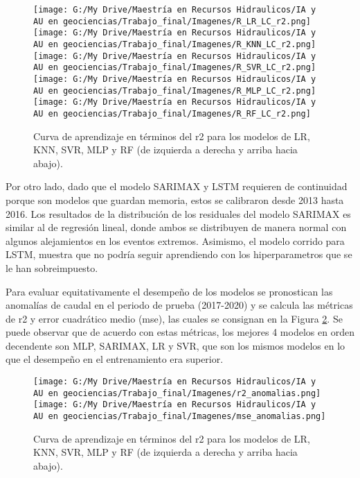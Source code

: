 \documentclass[draft]{agujournal2019}
\begin{document}
\begin{figure}[!]
	\centering%
	\texttt{[image: G:/My Drive/Maestría en Recursos Hidraulicos/IA y AU en geociencias/Trabajo\_final/Imagenes/R\_LR\_LC\_r2.png]}
	\texttt{[image: G:/My Drive/Maestría en Recursos Hidraulicos/IA y AU en geociencias/Trabajo\_final/Imagenes/R\_KNN\_LC\_r2.png]}
	\texttt{[image: G:/My Drive/Maestría en Recursos Hidraulicos/IA y AU en geociencias/Trabajo\_final/Imagenes/R\_SVR\_LC\_r2.png]}\\
	\texttt{[image: G:/My Drive/Maestría en Recursos Hidraulicos/IA y AU en geociencias/Trabajo\_final/Imagenes/R\_MLP\_LC\_r2.png]}
	\texttt{[image: G:/My Drive/Maestría en Recursos Hidraulicos/IA y AU en geociencias/Trabajo\_final/Imagenes/R\_RF\_LC\_r2.png]}
	\caption{Curva de aprendizaje en términos del r2 para los modelos de LR, KNN, SVR, MLP y RF (de izquierda a derecha y arriba hacia abajo).} \label{fig:LC}
\end{figure}

Por otro lado, dado que el modelo SARIMAX y LSTM requieren de continuidad porque son modelos que guardan memoria, estos se calibraron desde 2013 hasta 2016. Los resultados de la distribución de los residuales del modelo SARIMAX es similar al de regresión lineal, donde ambos se distribuyen de manera normal con algunos alejamientos en los eventos extremos. Asimismo, el modelo corrido para LSTM, muestra que no podría seguir aprendiendo con los hiperparametros que se le han sobreimpuesto.

Para evaluar equitativamente el desempeño de los modelos se pronostican las anomalías de caudal en el periodo de prueba (2017-2020) y se calcula las métricas de r2 y error cuadrático medio (mse), las cuales se consignan en la Figura \ref{fig:test_r2_mse}. Se puede observar que de acuerdo con estas métricas, los mejores 4 modelos en orden decendente son MLP, SARIMAX, LR y SVR, que son los mismos modelos en lo que el desempeño en el entrenamiento era superior. 

\begin{figure}[!]
	\centering%
	\texttt{[image: G:/My Drive/Maestría en Recursos Hidraulicos/IA y AU en geociencias/Trabajo\_final/Imagenes/r2\_anomalias.png]}
	\texttt{[image: G:/My Drive/Maestría en Recursos Hidraulicos/IA y AU en geociencias/Trabajo\_final/Imagenes/mse\_anomalias.png]}
	\caption{Curva de aprendizaje en términos del r2 para los modelos de LR, KNN, SVR, MLP y RF (de izquierda a derecha y arriba hacia abajo).} \label{fig:test_r2_mse}
\end{figure}
\end{document}
